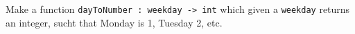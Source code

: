 Make a function \lstinline{dayToNumber : weekday -> int} which given a \lstinline{weekday} returns an integer, sucht that Monday is 1, Tuesday 2, etc.
